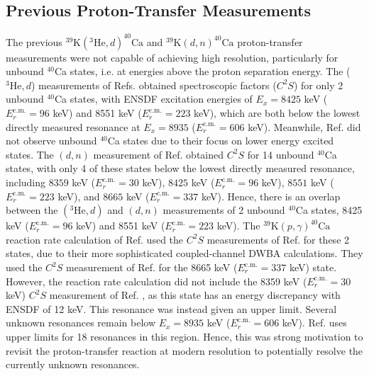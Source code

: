 
\subsection{Previous Proton-Transfer Measurements}

The previous $^{39}\mathrm{K}(^{3}\mathrm{He},d)^{40}\mathrm{Ca}$ \cite{Erskine1966,Seth1967,Forster1970,Cage1971} and $^{39}\mathrm{K}(d,n)^{40}\mathrm{Ca}$ \cite{Fuchs1969} proton-transfer measurements were not capable of achieving high resolution, particularly for unbound $^{40}$Ca states, i.e. at energies above the proton separation energy. The ($^{3}\mathrm{He},d$) measurements of Refs. \cite{Erskine1966,Seth1967,Cage1971} obtained spectroscopic factors ($C^{2}S$) for only 2 unbound $^{40}$Ca states, with ENSDF \cite{Chen2017} excitation energies of $E_{x} = 8425$ keV ($E^{\mathrm{c.m.}}_{r} = 96$ keV) and 8551 keV ($E^{\mathrm{c.m.}}_{r} = 223$ keV), which are both below the lowest directly measured resonance at $E_{x} = 8935$ ($E^{\mathrm{c.m.}}_{r} = 606$ keV). Meanwhile, Ref. \cite{Forster1970} did not observe unbound $^{40}$Ca states due to their focus on lower energy excited states. The $(d,n)$ measurement of Ref. \cite{Fuchs1969} obtained $C^{2}S$ for 14 unbound $^{40}$Ca states, with only 4 of these states below the lowest directly measured resonance, including $8359$ keV ($E^{\mathrm{c.m.}}_{r} = 30$ keV), $8425$ keV ($E^{\mathrm{c.m.}}_{r} = 96$ keV), $8551$ keV ($E^{\mathrm{c.m.}}_{r} = 223$ keV), and $8665$ keV ($E^{\mathrm{c.m.}}_{r} = 337$ keV). Hence, there is an overlap between the $(^{3}\mathrm{He},d)$ and $(d,n)$ measurements of 2 unbound $^{40}$Ca states, 8425 keV ($E^{\mathrm{c.m.}}_{r} = 96$ keV) and 8551 keV ($E^{\mathrm{c.m.}}_{r} = 223$ keV). The $^{39}\mathrm{K}(p,\gamma)^{40}\mathrm{Ca}$ reaction rate calculation of Ref. \cite{Longland2018} used the $C^{2}S$ measurements of Ref. \cite{Cage1971} for these 2 states, due to their more sophisticated coupled-channel DWBA calculations. They used the $C^{2}S$ measurement of Ref. \cite{Fuchs1969} for the 8665 keV ($E^{\mathrm{c.m.}}_{r} = 337$ keV) state. However, the reaction rate calculation did not include the 8359 keV ($E^{\mathrm{c.m.}}_{r} = 30$ keV) $C^{2}S$ measurement of Ref. \cite{Fuchs1969}, as this state has an energy discrepancy with ENSDF \cite{Chen2017} of 12 keV. This resonance was instead given an upper limit. Several unknown resonances remain below $E_{x} = 8935$ keV ($E^{\mathrm{c.m.}}_{r} = 606$ keV). Ref. \cite{Longland2018} uses upper limits for 18 resonances in this region. Hence, this was strong motivation to revisit the proton-transfer reaction at modern resolution to potentially resolve the currently unknown resonances.


